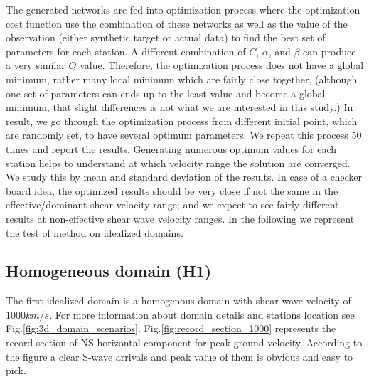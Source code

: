 

The generated networks are fed into optimization process where the optimization cost function use the combination of these networks as well as the value of the observation (either synthetic target or actual data) to find the best set of parameters for each station.  A different combination of $C$, $\alpha$, and $\beta$ can produce a very similar $Q$ value. Therefore, the optimization process does not have a global minimum, rather many local minimum which are fairly close together, (although one set of parameters can ends up to the least value and become a global minimum, that slight differences is not what we are interested in this study.) In result, we go through the optimization process from different initial point, which are randomly set, to have several optimum parameters. We repeat this process 50 times and report the results. Generating numerous optimum values for each station helps to understand at which velocity range the solution are converged. We study this by mean and standard deviation of the results. In case of a checker board idea, the optimized results should be very close if not the same in the effective/dominant shear velocity range; and we expect to see fairly different results at non-effective shear wave velocity ranges. In the following we represent the test of method on idealized domains. 

\subsection{Homogeneous domain (H1)}

The first idealized domain is a homogenous domain with shear wave velocity of $1000 km/s$. For more information about domain details and stations location see Fig.\ref{fig:3d_domain_scenarios}. Fig.\ref{fig:record_section_1000} represents the record section of NS horizontal component for peak ground velocity. According to the figure a clear S-wave arrivals and peak value of them is obvious and easy to pick.

